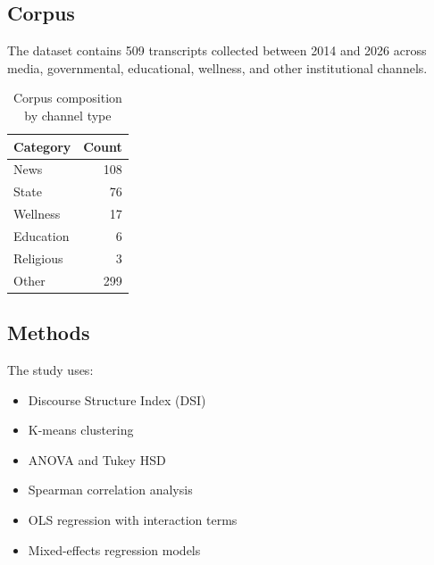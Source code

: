 \documentclass[11pt]{article}
\begin{document}
\subsection{Corpus}



The dataset contains 509 transcripts collected between 2014 and 2026 across media, governmental, educational, wellness, and other institutional channels.



\begin{table}[H]

\centering

\begin{tabular}{lr}

\toprule

Category & Count \\

\midrule

News & 108 \\

State & 76 \\

Wellness & 17 \\

Education & 6 \\

Religious & 3 \\

Other & 299 \\

\bottomrule

\end{tabular}

\caption{Corpus composition by channel type}

\end{table}



\subsection{Methods}



The study uses:



\begin{itemize}

\item Discourse Structure Index (DSI)

\item K-means clustering

\item ANOVA and Tukey HSD

\item Spearman correlation analysis

\item OLS regression with interaction terms

\item Mixed-effects regression models

\end{itemize}
\end{document}
